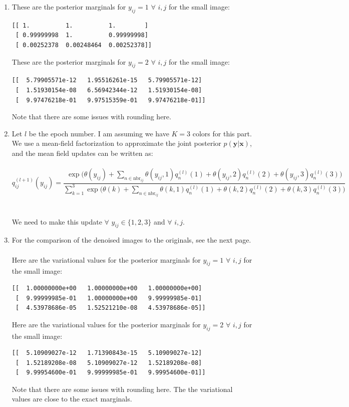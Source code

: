 \documentclass[submit]{harvardml}
\theoremstyle{plain}
\begin{document}
\begin{enumerate}[label=1.\arabic*.]
\item These are the posterior marginals for $y_{ij}=1$ $\forall$ $i,j$ for the small image:
\begin{verbatim}
[[ 1.          1.          1.        ]
 [ 0.99999998  1.          0.99999998]
 [ 0.00252378  0.00248464  0.00252378]]
\end{verbatim}
These are the posterior marginals for $y_{ij}=2$ $\forall$ $i,j$ for the small image:
\begin{verbatim}
[[  5.79905571e-12   1.95516261e-15   5.79905571e-12]
 [  1.51930154e-08   6.56942344e-12   1.51930154e-08]
 [  9.97476218e-01   9.97515359e-01   9.97476218e-01]]
\end{verbatim}
Note that there are some issues with rounding here.
\item Let $l$ be the epoch number. I am assuming we have $K=3$ colors for this part. We use a mean-field factorization to approximate the joint posterior $p(\mathbf{y}|\mathbf{x})$, and the mean field updates can be written as:\\\\
$q^{(l+1)}_{ij}(y_{ij})=\dfrac{\exp\bigg(\theta(y_{ij})+\displaystyle\sum_{n\in\textrm{nbr}_{ij}}\theta(y_{ij},1)q^{(l)}_n(1)+\theta(y_{ij},2)q^{(l)}_n(2)+\theta(y_{ij},3)q^{(l)}_n(3)\bigg)}{\displaystyle\sum_{k=1}^3\exp\bigg(\theta(k)+\displaystyle\sum_{n\in\textrm{nbr}_{ij}}\theta(k,1)q^{(l)}_n(1)+\theta(k,2)q^{(l)}_n(2)+\theta(k,3)q^{(l)}_n(3)\bigg)}$\\\\\\
We need to make this update $\forall$ $y_{ij}\in\{1,2,3\}$ and $\forall$ $i,j$.\\
\item For the comparison of the denoised images to the originals, see the next page.\\\\ 
Here are the variational values for the posterior marginals for $y_{ij}=1$ $\forall$ $i,j$ for the small image:
\begin{verbatim}
[[  1.00000000e+00   1.00000000e+00   1.00000000e+00]
 [  9.99999985e-01   1.00000000e+00   9.99999985e-01]
 [  4.53978686e-05   1.52521210e-08   4.53978686e-05]]
\end{verbatim}
Here are the variational values for the posterior marginals for $y_{ij}=2$ $\forall$ $i,j$ for the small image:
\begin{verbatim}
[[  5.10909027e-12   1.71390843e-15   5.10909027e-12]
 [  1.52189208e-08   5.10909027e-12   1.52189208e-08]
 [  9.99954600e-01   9.99999985e-01   9.99954600e-01]]
\end{verbatim}
Note that there are some issues with rounding here. The the variational values are close to the exact marginals.
\end{enumerate}
\end{document}
